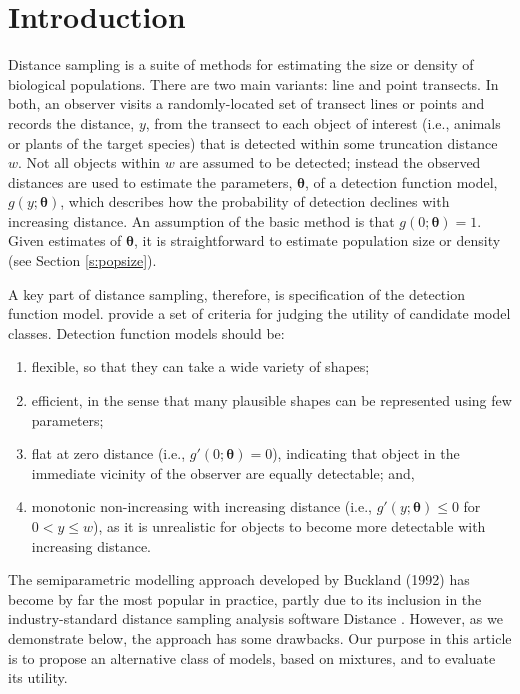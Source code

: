 \documentclass[useAMS,referee,usenatbib]{biom}
\begin{document}
\section{Introduction}
\label{s:intro}


Distance sampling \citep{Buckland:2001vm,Buckland:2004ts} is a suite of methods for estimating the size or density of biological populations.  There are two main variants: line and point transects. In both, an observer visits a randomly-located set of transect lines or points and records the distance, $y$, from the transect to each object of interest (i.e., animals or plants of the target species) that is detected within some truncation distance $w$.  Not all objects within $w$ are assumed to be detected; instead the observed distances are used to estimate the parameters, $\bm{\theta}$, of a detection function model, $g(y;\bm{\theta})$, which describes how the probability of detection declines with increasing distance.  An assumption of the basic method is that $g(0;\bm{\theta})=1$. Given estimates of $\bm{\theta}$, it is straightforward to estimate population size or density (see Section \ref{s:popsize}).

A key part of distance sampling, therefore, is specification of the detection function model.  \citet[][Chapter 2]{Buckland:2001vm} provide a set of criteria for judging the utility of candidate model classes. Detection function models should be:
\begin{enumerate}
\item flexible, so that they can take a wide variety of shapes;
\item efficient, in the sense that many plausible shapes can be represented using few parameters;
\item flat at zero distance (i.e., $g'(0;\bm{\theta})=0$), indicating that object in the immediate vicinity of the observer are equally detectable; and,
\item monotonic non-increasing with increasing distance (i.e., $g'(y;\bm{\theta}) \leq 0$ for $0<y\leq w$), as it is unrealistic for objects to become more detectable with increasing distance.
\end{enumerate}
The semiparametric modelling approach developed by Buckland (1992) has become by far the most popular in practice, partly due to its inclusion in the industry-standard distance sampling analysis software Distance \citep{Thomas:2010cf}.  However, as we demonstrate below, the approach has some drawbacks.  Our purpose in this article is to propose an alternative class of models, based on mixtures, and to evaluate its utility.
\end{document}
